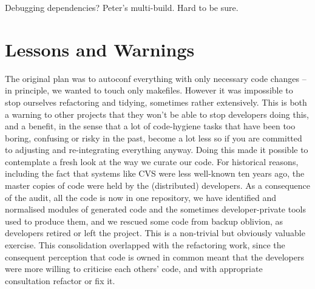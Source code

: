 \documentclass{speauth}
\begin{document}

Debugging dependencies?  Peter's multi-build.  Hard to be sure.


\section{Lessons and Warnings}
\label{s:lessons}

The original plan was to autoconf everything with only necessary code
changes -- in principle, we wanted to touch only makefiles.  However
it was impossible to stop ourselves refactoring and tidying, sometimes
rather extensively.  This is both a warning to other projects that
they won't be able to stop developers doing this, and a benefit, in
the sense that a lot of code-hygiene tasks that have been too boring,
confusing or risky in the past, become a lot less so if you are
committed to adjusting and re-integrating everything anyway.  Doing
this made it possible to contemplate a fresh look at the way we curate
our code.  For historical reasons, including the fact that systems
like CVS were less well-known ten years ago, the master copies of code
were held by the (distributed) developers.  As a consequence of the
audit, all the code is now in one repository, we have identified and
normalised modules of generated code and the sometimes
developer-private tools used to produce them, and we rescued some code
from backup oblivion, as developers retired or left the project.  This
is a non-trivial but obviously valuable exercise.  This consolidation
overlapped with the refactoring work, since the consequent perception
that code is owned in common meant that the developers were more
willing to criticise each others' code, and with appropriate
consultation refactor or fix it.
\end{document}

